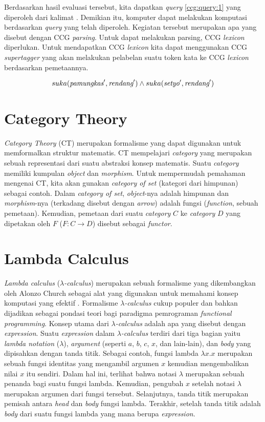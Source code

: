 Berdasarkan hasil evaluasi tersebut, kita dapatkan \textit{query} \ref{ccg:query:1}
yang diperoleh dari kalimat .
Demikian itu, komputer dapat melakukan komputasi berdasarkan \textit{query} yang telah diperoleh.
Kegiatan tersebut merupakan apa yang disebut dengan CCG \textit{parsing}.
Untuk dapat melakukan parsing, CCG \textit{lexicon} diperlukan.
Untuk mendapatkan CCG \textit{lexicon} kita dapat menggunakan CCG \textit{supertagger}
yang akan melakukan pelabelan suatu token kata ke CCG \textit{lexicon} berdasarkan
pemetaannya.

\begin{equation}\label{ccg:query:1}
  suka(\mbox{\it pamungkas}^\prime, \mbox{\it rendang}^\prime) \land suka(\mbox{\it setyo}^\prime, \mbox{\it rendang}^\prime)
\end{equation}

\section{Category Theory}
\textit{Category Theory} (CT) merupakan formalisme yang dapat digunakan untuk memformalkan
struktur matematis.
CT mempelajari \textit{category} yang merupakan sebuah representasi dari suatu
abstraksi konsep matematis.
Suatu \textit{category} memiliki kumpulan \textit{object} dan \textit{morphism}.
Untuk mempermudah pemahaman mengenai CT, kita akan gunakan
\textit{category of set} (kategori dari himpunan) sebagai contoh.
Dalam \textit{category of set}, \textit{object}-nya adalah himpunan dan
\textit{morphism}-nya (terkadang disebut dengan \textit{arrow}) adalah fungsi
(\textit{function}, sebuah pemetaan).
Kemudian, pemetaan dari suatu \textit{category} $C$ ke \textit{category} $D$
yang dipetakan oleh $F$ ($F: C \rightarrow D$) disebut sebagai \textit{functor}.


\section{Lambda Calculus}
\textit{Lambda calculus} ({$\lambda$}\textit{-calculus}) merupakan sebuah formalisme yang dikembangkan
oleh Alonzo Church sebagai alat yang digunakan untuk memahami konsep komputasi yang efektif
\cite{DBLP:journals/corr/Rojas15}.
Formalisme {$\lambda$}\textit{-calculus} cukup populer dan bahkan dijadikan sebagai pondasi teori bagi
paradigma pemrograman \textit{functional programming}.
Konsep utama dari {$\lambda$}\textit{-calculus} adalah apa yang disebut dengan \textit{expression}.
Suatu \textit{expression} dalam {$\lambda$}\textit{-calculus} terdiri dari tiga bagian yaitu
\textit{lambda notation} ({$\lambda$}), \textit{argument} (seperti $a$, $b$, $c$, $x$, dan lain-lain),
dan \textit{body} yang dipisahkan dengan tanda titik.
Sebagai contoh, fungsi lambda ${\lambda}x. x$ merupakan sebuah fungsi identitas yang mengambil
argumen $x$ kemudian mengembalikan nilai $x$ itu sendiri.
Dalam hal ini, terlihat bahwa notasi {$\lambda$} merupakan sebuah penanda bagi suatu fungsi lambda.
Kemudian, pengubah $x$ setelah notasi {$\lambda$} merupakan argumen dari fungsi tersebut.
Selanjutnya, tanda titik merupakan pemisah antara \textit{head} dan \textit{body} fungsi lambda.
Terakhir, setelah tanda titik adalah \textit{body} dari suatu fungsi lambda yang mana berupa
\textit{expression}.

